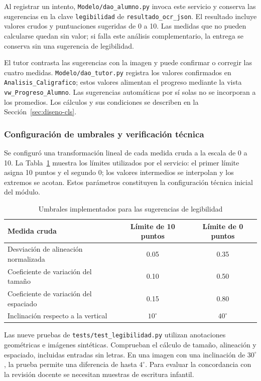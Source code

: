 Al registrar un intento, \texttt{Modelo/dao\_alumno.py} invoca este servicio y conserva las sugerencias en la clave \texttt{legibilidad} de \texttt{resultado\_ocr\_json}. El resultado incluye valores crudos y puntuaciones sugeridas de 0 a 10. Las medidas que no pueden calcularse quedan sin valor; si falla este análisis complementario, la entrega se conserva sin una sugerencia de legibilidad.

El tutor contrasta las sugerencias con la imagen y puede confirmar o corregir las cuatro medidas. \texttt{Modelo/dao\_tutor.py} registra los valores confirmados en \texttt{Analisis\_Caligrafico}; estos valores alimentan el progreso mediante la vista \texttt{vw\_Progreso\_Alumno}. Las sugerencias automáticas por sí solas no se incorporan a los promedios. Los cálculos y sus condiciones se describen en la Sección~\ref{sec:diseno-cls}.

\subsubsection{Configuración de umbrales y verificación técnica}
Se configuró una transformación lineal de cada medida cruda a la escala de 0 a 10. La Tabla~\ref{tab:umbrales-legibilidad-implementados} muestra los límites utilizados por el servicio: el primer límite asigna 10 puntos y el segundo 0; los valores intermedios se interpolan y los extremos se acotan. Estos parámetros constituyen la configuración técnica inicial del módulo.

\begin{table}[H]
\centering
\caption{Umbrales implementados para las sugerencias de legibilidad}
\label{tab:umbrales-legibilidad-implementados}
\begin{tabular}{lcc}
\toprule
\textbf{Medida cruda} & \textbf{Límite de 10 puntos} & \textbf{Límite de 0 puntos} \\
\midrule
Desviación de alineación normalizada & 0.05 & 0.35 \\
Coeficiente de variación del tamaño & 0.10 & 0.50 \\
Coeficiente de variación del espaciado & 0.15 & 0.80 \\
Inclinación respecto a la vertical & $10^{\circ}$ & $40^{\circ}$ \\
\bottomrule
\end{tabular}
\end{table}

Las nueve pruebas de \texttt{tests/test\_legibilidad.py} utilizan anotaciones geométricas e imágenes sintéticas. Comprueban el cálculo de tamaño, alineación y espaciado, incluidas entradas sin letras. En una imagen con una inclinación de $30^{\circ}$, la prueba permite una diferencia de hasta $4^{\circ}$. Para evaluar la concordancia con la revisión docente se necesitan muestras de escritura infantil.
